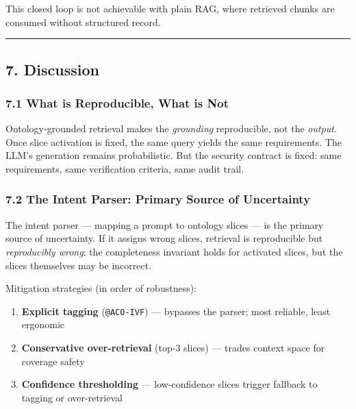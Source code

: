 \documentclass[
]{article}
\providecommand{\tightlist}{%
  \setlength{\itemsep}{0pt}\setlength{\parskip}{0pt}}
\begin{document}
This closed loop is not achievable with plain RAG, where retrieved
chunks are consumed without structured record.

\begin{center}\rule{0.5\linewidth}{0.5pt}\end{center}

\subsection{7. Discussion}\label{discussion}

\subsubsection{7.1 What is Reproducible, What is
Not}\label{what-is-reproducible-what-is-not}

Ontology-grounded retrieval makes the \emph{grounding} reproducible, not
the \emph{output}. Once slice activation is fixed, the same query yields
the same requirements. The LLM's generation remains probabilistic. But
the security contract is fixed: same requirements, same verification
criteria, same audit trail.

\subsubsection{7.2 The Intent Parser: Primary Source of
Uncertainty}\label{the-intent-parser-primary-source-of-uncertainty}

The intent parser --- mapping a prompt to ontology slices --- is the
primary source of uncertainty. If it assigns wrong slices, retrieval is
reproducible but \emph{reproducibly wrong}: the completeness invariant
holds for activated slices, but the slices themselves may be incorrect.

Mitigation strategies (in order of robustness):

\begin{enumerate}
\def\labelenumi{\arabic{enumi}.}
\tightlist
\item
  \textbf{Explicit tagging} (\texttt{@ACO-IVF}) --- bypasses the parser;
  most reliable, least ergonomic
\item
  \textbf{Conservative over-retrieval} (top-3 slices) --- trades context
  space for coverage safety
\item
  \textbf{Confidence thresholding} --- low-confidence slices trigger
  fallback to tagging or over-retrieval
\end{enumerate}
\end{document}
